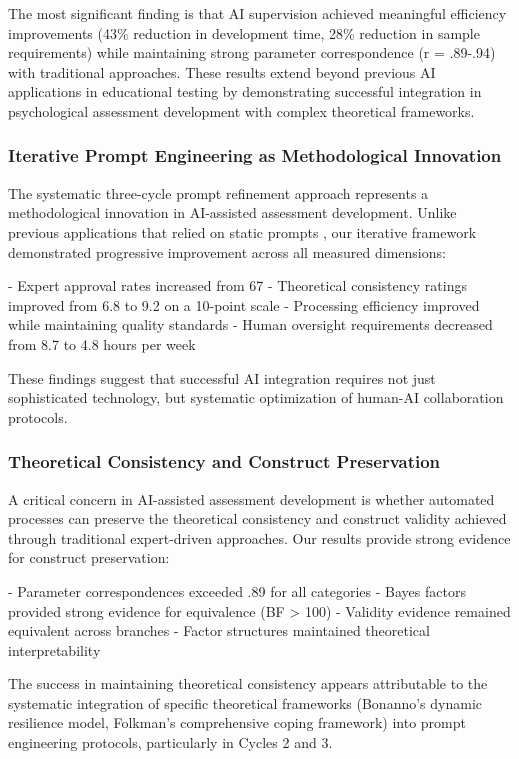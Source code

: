 \documentclass[12pt,a4paper]{article}
\begin{document}
The most significant finding is that AI supervision achieved meaningful efficiency improvements (43\% reduction in development time, 28\% reduction in sample requirements) while maintaining strong parameter correspondence (r = .89-.94) with traditional approaches. These results extend beyond previous AI applications in educational testing \cite{Chen2021, Yan2020} by demonstrating successful integration in psychological assessment development with complex theoretical frameworks.

\subsubsection{Iterative Prompt Engineering as Methodological Innovation}

The systematic three-cycle prompt refinement approach represents a methodological innovation in AI-assisted assessment development. Unlike previous applications that relied on static prompts \cite{Shermis2013}, our iterative framework demonstrated progressive improvement across all measured dimensions:

- Expert approval rates increased from 67%
- Theoretical consistency ratings improved from 6.8 to 9.2 on a 10-point scale  
- Processing efficiency improved while maintaining quality standards
- Human oversight requirements decreased from 8.7 to 4.8 hours per week

These findings suggest that successful AI integration requires not just sophisticated technology, but systematic optimization of human-AI collaboration protocols.

\subsubsection{Theoretical Consistency and Construct Preservation}

A critical concern in AI-assisted assessment development is whether automated processes can preserve the theoretical consistency and construct validity achieved through traditional expert-driven approaches. Our results provide strong evidence for construct preservation:

- Parameter correspondences exceeded .89 for all categories
- Bayes factors provided strong evidence for equivalence (BF > 100)
- Validity evidence remained equivalent across branches
- Factor structures maintained theoretical interpretability

The success in maintaining theoretical consistency appears attributable to the systematic integration of specific theoretical frameworks (Bonanno's dynamic resilience model, Folkman's comprehensive coping framework) into prompt engineering protocols, particularly in Cycles 2 and 3.
\end{document}
